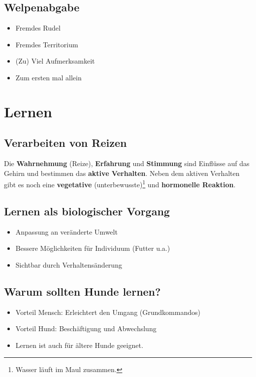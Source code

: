     \subsection{Welpenabgabe}
        \begin{itemize}
            \item Fremdes \glqq Rudel\grqq{}
            \item Fremdes Territorium
            \item (Zu) Viel Aufmerksamkeit
            \item Zum ersten mal allein
        \end{itemize}


\section{Lernen}

    \subsection{Verarbeiten von Reizen}
        Die \textbf{Wahrnehmung} (Reize), \textbf{Erfahrung} und \textbf{Stimmung} sind Einflüsse auf das Gehirn und bestimmen das \textbf{aktive Verhalten}.
        Neben dem aktiven Verhalten gibt es noch eine \textbf{vegetative} (unterbewusste)\footnote{Wasser läuft im Maul zusammen.} und \textbf{hormonelle Reaktion}.

    \subsection{Lernen als biologischer Vorgang}
        \begin{itemize}
            \item Anpassung an veränderte Umwelt
            \item Bessere Möglichkeiten für Individuum (Futter u.a.)
            \item Sichtbar durch Verhaltensänderung
        \end{itemize}

    \subsection{Warum sollten Hunde lernen?}
        \begin{itemize}
            \item Vorteil Mensch: Erleichtert den Umgang (Grundkommandos)
            \item Vorteil Hund: Beschäftigung und Abwechslung
            \item Lernen ist auch für ältere Hunde geeignet.
        \end{itemize}

